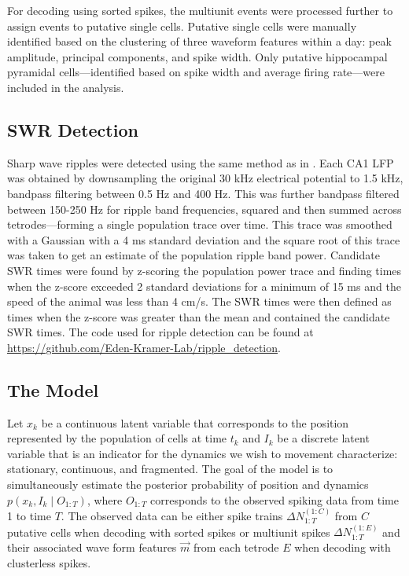 \documentclass[times, twoside]{zHenriquesLab-StyleBioRxiv}
\begin{document}
For decoding using sorted spikes, the multiunit events were processed further to assign events to putative single cells. Putative single cells were manually identified based on the clustering of three waveform features within a day: peak amplitude, principal components, and spike width. Only putative hippocampal pyramidal cells---identified based on spike width and average firing rate---were included in the analysis.

\subsection*{SWR Detection}
Sharp wave ripples were detected using the same method as in \cite{Kayhippocampalnetworkspatial2016}. Each CA1 LFP was obtained by downsampling the original 30 kHz electrical potential to 1.5 kHz, bandpass filtering between 0.5 Hz and 400 Hz. This was further bandpass filtered between 150-250 Hz for ripple band frequencies, squared and then summed across tetrodes---forming a single population trace over time. This trace was smoothed with a Gaussian with a 4 ms standard deviation and the square root of this trace was taken to get an estimate of the population ripple band power. Candidate SWR times were found by z-scoring the population power trace and finding times when the z-score exceeded 2 standard deviations for a minimum of 15 ms and the speed of the animal was less than 4 cm/s. The SWR times were then defined as times when the z-score was greater than the mean and contained the candidate SWR times. The code used for ripple detection can be found at \url{https://github.com/Eden-Kramer-Lab/ripple_detection}.

\subsection*{The Model}
Let $x_{k}$ be a continuous latent variable that corresponds to the position represented by the population of cells at time $t_k$ and $I_{k}$ be a discrete latent variable that is an indicator for the dynamics we wish to movement characterize: stationary, continuous, and fragmented. The goal of the model is to simultaneously estimate the posterior probability of position and dynamics $p(x_k, I_k \mid O_{1:T})$, where $O_{1:T}$ corresponds to the observed spiking data from time 1 to time $T$. The observed data can be either spike trains $\Delta N_{1:T}^{(1:C)}$ from $C$ putative cells when decoding with sorted spikes or multiunit spikes $\Delta N_{1:T}^{(1:E)}$ and their associated wave form features $\Vec{m}$ from each tetrode $E$ when decoding with clusterless spikes.
\end{document}
